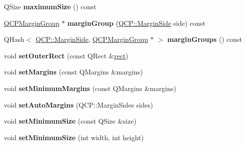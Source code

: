 \begin{DoxyCompactItemize}
\mbox{\label{class_q_c_p_layout_element_afb9503858d4aa0f3b9f1794b084fb40a}} 
Q\+Size {\bfseries maximum\+Size} () const
\item 
\mbox{\label{class_q_c_p_layout_element_a8af6bcf81e12fe1d6f44490f34522b90}} 
\hyperlink{class_q_c_p_margin_group}{Q\+C\+P\+Margin\+Group} $\ast$ {\bfseries margin\+Group} (\hyperlink{namespace_q_c_p_a7e487e3e2ccb62ab7771065bab7cae54}{Q\+C\+P\+::\+Margin\+Side} side) const
\item 
\mbox{\label{class_q_c_p_layout_element_ac8d1139a81a1625860647e307ae2b733}} 
Q\+Hash$<$ \hyperlink{namespace_q_c_p_a7e487e3e2ccb62ab7771065bab7cae54}{Q\+C\+P\+::\+Margin\+Side}, \hyperlink{class_q_c_p_margin_group}{Q\+C\+P\+Margin\+Group} $\ast$ $>$ {\bfseries margin\+Groups} () const
\item 
\mbox{\label{class_q_c_p_layout_element_a38975ea13e36de8e53391ce41d94bc0f}} 
void {\bfseries set\+Outer\+Rect} (const Q\+Rect \&\hyperlink{class_q_c_p_layout_element_a208effccfe2cca4a0eaf9393e60f2dd4}{rect})
\item 
\mbox{\label{class_q_c_p_layout_element_a8f450b1f3f992ad576fce2c63d8b79cf}} 
void {\bfseries set\+Margins} (const Q\+Margins \&margins)
\item 
\mbox{\label{class_q_c_p_layout_element_a0a8a17abc16b7923159fcc7608f94673}} 
void {\bfseries set\+Minimum\+Margins} (const Q\+Margins \&margins)
\item 
\mbox{\label{class_q_c_p_layout_element_accfda49994e3e6d51ed14504abf9d27d}} 
void {\bfseries set\+Auto\+Margins} (Q\+C\+P\+::\+Margin\+Sides sides)
\item 
\mbox{\label{class_q_c_p_layout_element_a5dd29a3c8bc88440c97c06b67be7886b}} 
void {\bfseries set\+Minimum\+Size} (const Q\+Size \&size)
\item 
\mbox{\label{class_q_c_p_layout_element_a8e0447614a0bf92de9a7304588c6b96e}} 
void {\bfseries set\+Minimum\+Size} (int width, int height)

\end{DoxyCompactItemize}
